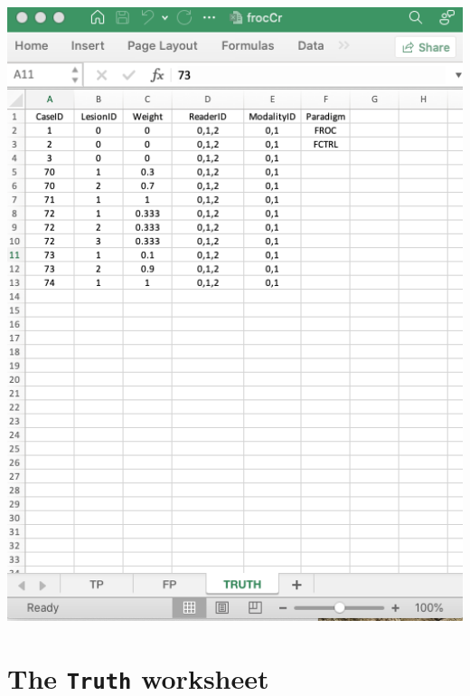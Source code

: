 \documentclass[
]{book}
\begin{document}
\includegraphics[width=1\textwidth,height=\textheight]{images/software-details/frocCrTruth.png}

\hypertarget{the-truth-worksheet}{%
\section{\texorpdfstring{The \texttt{Truth} worksheet}{The Truth worksheet}}\label{the-truth-worksheet}}
\end{document}
